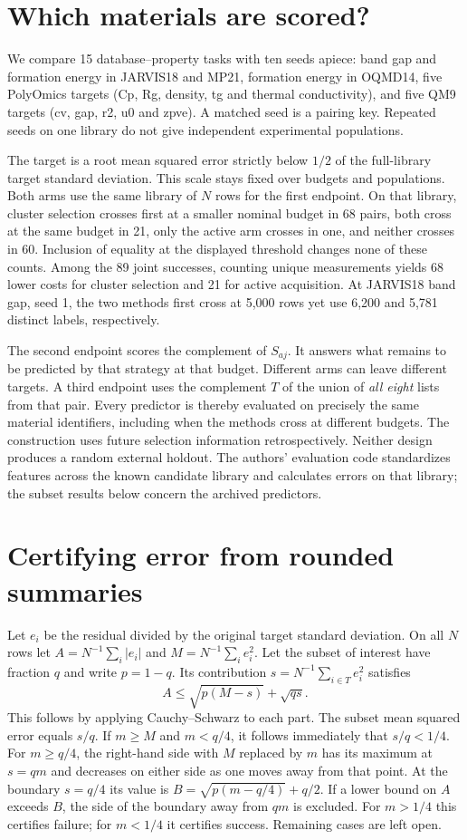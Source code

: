 \documentclass[11pt]{article}
\begin{document}
\newpage
\section{Which materials are scored?}
We compare 15 database--property tasks with ten seeds apiece: band gap and formation energy in JARVIS18 and MP21, formation energy in OQMD14, five PolyOmics targets (Cp, Rg, density, tg and thermal conductivity), and five QM9 targets (cv, gap, r2, u0 and zpve). A matched seed is a pairing key. Repeated seeds on one library do not give independent experimental populations.

The target is a root mean squared error strictly below $1/2$ of the full-library target standard deviation. This scale stays fixed over budgets and populations. Both arms use the same library of $N$ rows for the first endpoint. On that library, cluster selection crosses first at a smaller nominal budget in 68 pairs, both cross at the same budget in 21, only the active arm crosses in one, and neither crosses in 60. Inclusion of equality at the displayed threshold changes none of these counts. Among the 89 joint successes, counting unique measurements yields 68 lower costs for cluster selection and 21 for active acquisition. At JARVIS18 band gap, seed 1, the two methods first cross at 5,000 rows yet use 6,200 and 5,781 distinct labels, respectively.

The second endpoint scores the complement of $S_{aj}$. It answers what remains to be predicted by that strategy at that budget. Different arms can leave different targets. A third endpoint uses the complement $T$ of the union of \emph{all eight} lists from that pair. Every predictor is thereby evaluated on precisely the same material identifiers, including when the methods cross at different budgets. The construction uses future selection information retrospectively. Neither design produces a random external holdout. The authors' evaluation code standardizes features across the known candidate library and calculates errors on that library; the subset results below concern the archived predictors.

\section{Certifying error from rounded summaries}
Let $e_i$ be the residual divided by the original target standard deviation. On all $N$ rows let $A=N^{-1}\sum_i|e_i|$ and $M=N^{-1}\sum_i e_i^2$. Let the subset of interest have fraction $q$ and write $p=1-q$. Its contribution $s=N^{-1}\sum_{i\in T}e_i^2$ satisfies
\[
 A\leq \sqrt{p(M-s)}+\sqrt{qs}.
\]
This follows by applying Cauchy--Schwarz to each part. The subset mean squared error equals $s/q$. If $m\geq M$ and $m<q/4$, it follows immediately that $s/q<1/4$. For $m\geq q/4$, the right-hand side with $M$ replaced by $m$ has its maximum at $s=qm$ and decreases on either side as one moves away from that point. At the boundary $s=q/4$ its value is $B=\sqrt{p(m-q/4)}+q/2$. If a lower bound on $A$ exceeds $B$, the side of the boundary away from $qm$ is excluded. For $m>1/4$ this certifies failure; for $m<1/4$ it certifies success. Remaining cases are left open.
\end{document}
